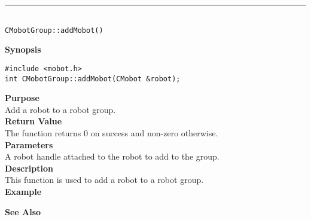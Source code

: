 \noindent
\vspace{5pt}
\rule{4.5in}{0.015in}\\
\noindent
{\LARGE \texttt{CMobotGroup::addMobot()}}\\
{}

\noindent
{\bf Synopsis}
\vspace{-8pt}
\begin{verbatim}
#include <mobot.h>
int CMobotGroup::addMobot(CMobot &robot);
\end{verbatim}

\noindent
{\bf Purpose}\\
Add a robot to a robot group.\\

\noindent
{\bf Return Value}\\
The function returns 0 on success and non-zero otherwise.\\

\noindent
{\bf Parameters}\\
A robot handle attached to the robot to add to the group.\\

\noindent
{\bf Description}\\
This function is used to add a robot to a robot group. \\
\noindent
{\bf Example}\\
\noindent

\noindent
{\bf See Also}\\

